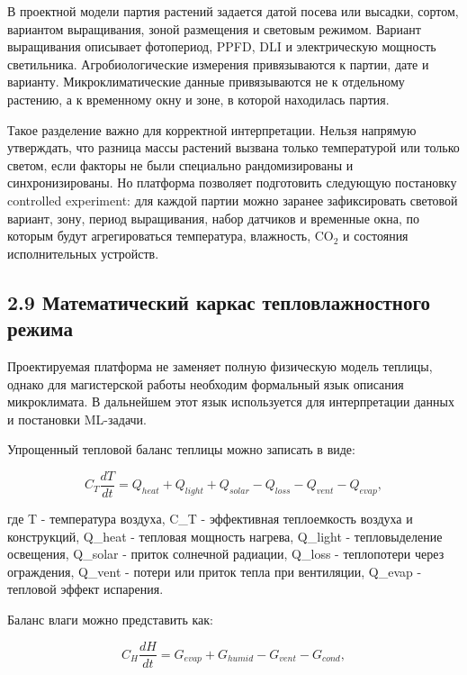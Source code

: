 \documentclass[a4paper,14pt]{extarticle}
\renewcommand{\texttt}[1]{\textnormal{#1}}
\begin{document}
В проектной модели партия растений задается датой посева или высадки,
сортом, вариантом выращивания, зоной размещения и световым режимом.
Вариант выращивания описывает фотопериод, PPFD, DLI и электрическую
мощность светильника. Агробиологические измерения привязываются к
партии, дате и варианту. Микроклиматические данные привязываются не к
отдельному растению, а к временному окну и зоне, в которой находилась
партия.

Такое разделение важно для корректной интерпретации. Нельзя напрямую
утверждать, что разница массы растений вызвана только температурой или
только светом, если факторы не были специально рандомизированы и
синхронизированы. Но платформа позволяет подготовить следующую
постановку controlled experiment: для каждой партии можно заранее
зафиксировать световой вариант, зону, период выращивания, набор датчиков
и временные окна, по которым будут агрегироваться температура,
влажность, CO\(_2\) и состояния исполнительных устройств.

\subsection{2.9 Математический каркас тепловлажностного
режима}\label{ux43cux430ux442ux435ux43cux430ux442ux438ux447ux435ux441ux43aux438ux439-ux43aux430ux440ux43aux430ux441-ux442ux435ux43fux43bux43eux432ux43bux430ux436ux43dux43eux441ux442ux43dux43eux433ux43e-ux440ux435ux436ux438ux43cux430}

Проектируемая платформа не заменяет полную физическую модель теплицы,
однако для магистерской работы необходим формальный язык описания
микроклимата. В дальнейшем этот язык используется для интерпретации
данных и постановки ML-задачи.

Упрощенный тепловой баланс теплицы можно записать в виде:

\[
C_T \frac{dT}{dt} = Q_{heat} + Q_{light} + Q_{solar} - Q_{loss} - Q_{vent} - Q_{evap},
\]

где \texttt{T} - температура воздуха, \texttt{C\_T} - эффективная
теплоемкость воздуха и конструкций, \texttt{Q\_heat} - тепловая мощность
нагрева, \texttt{Q\_light} - тепловыделение освещения, \texttt{Q\_solar}
- приток солнечной радиации, \texttt{Q\_loss} - теплопотери через
ограждения, \texttt{Q\_vent} - потери или приток тепла при вентиляции,
\texttt{Q\_evap} - тепловой эффект испарения.

Баланс влаги можно представить как:

\[
C_H \frac{dH}{dt} = G_{evap} + G_{humid} - G_{vent} - G_{cond},
\]
\end{document}
